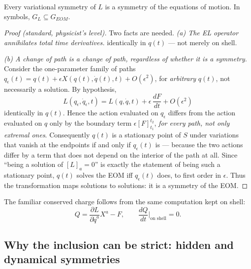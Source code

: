 \begin{proposition}
\label{prop:noether-forward}
Every variational symmetry of $L$ is a symmetry of the equations of motion. In
    symbols, $G_L \subseteq G_{EOM}$.
\end{proposition}

\begin{proof}[Proof (standard, physicist's level)]
Two facts are needed.
\emph{(a) The EL operator annihilates total time derivatives.} identically in $q(t)$ — not merely on shell.

\emph{(b) A change of path is a change of path, regardless of whether it is a symmetry.} 
    Consider the one-parameter family of paths $q_\epsilon(t) = q(t) + \epsilon X(q(t),\dot q(t),t) + O( \epsilon^2)$, for \emph{arbitrary} $q(t)$, not necessarily a solution. By hypothesis,
\[
L(q_\epsilon,\dot q_\epsilon,t) = L(q,\dot q,t) + \epsilon\, \frac{dF}{dt} + O(\epsilon^2)
\]
identically in $q(t)$. Hence the action evaluated on $q_\epsilon$ differs from
    the action evaluated on $q$ only by the boundary term
    $\epsilon[F]_{t_1}^{t_2}$, \emph{for every path, not only extremal ones}.
    Consequently $q(t)$ is a stationary point of $S$ under variations that
    vanish at the endpoints if and only if $q_\epsilon(t)$ is — because the two
    actions differ by a term that does not depend on the interior of the path
    at all. Since ``being a solution of $[L]_a=0$'' is exactly the statement of
    being such a stationary point, $q(t)$ solves the EOM iff $q_\epsilon(t)$
    does, to first order in $\epsilon$. Thus the transformation maps solutions
    to solutions: it is a symmetry of the EOM.
\end{proof}

The familiar conserved charge follows from the same computation kept on shell:
\[
Q = \frac{\partial L}{\partial \dot q^a} X^a - F, \qquad \frac{dQ}{dt}\Big|_{\text{on shell}} = 0 .
\]

\subsection{Why the inclusion can be strict: hidden and dynamical symmetries}
\label{sec:hidden}

